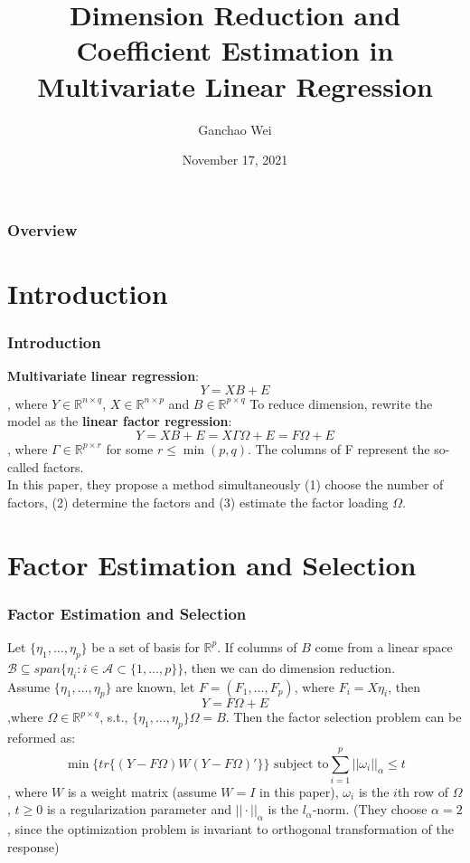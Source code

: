 \documentclass{beamer}
\title[multi-ridge]{Dimension Reduction and Coefficient Estimation in Multivariate Linear Regression}
\author{Ganchao Wei}
\date{November 17, 2021}
\begin{document}
	
	\begin{frame}
		\titlepage %
	\end{frame}
	
	\begin{frame}
		\frametitle{Overview} %
		\tableofcontents
	\end{frame}
	
	
	\section{Introduction}
	
	\begin{frame}
		\frametitle{Introduction}
		\textbf{Multivariate linear regression}: 
		$$Y=XB + E$$
		, where $Y\in\mathbb{R}^{n\times q}$, $X\in \mathbb{R}^{n\times p}$ and $B\in \mathbb{R}^{p\times q}$
		To reduce dimension, rewrite the model as the \textbf{linear factor regression}:
		$$Y=XB+E=X\Gamma\Omega + E = F\Omega + E$$
		, where $\Gamma\in\mathbb{R}^{p\times r}$ for some $r\leq \min(p,q)$. The columns of F represent the so-called factors.\\
		\vspace{\baselineskip}
		In this paper, they propose a method simultaneously (1) choose the number of factors, (2) determine the factors and (3) estimate the factor loading $\Omega$.
	\end{frame}
	
	\section{Factor Estimation and Selection}
	
	\begin{frame}
	\frametitle{Factor Estimation and Selection}
	Let $\{\eta_1,\ldots,\eta_p\}$ be a set of basis for $\mathbb{R}^p$. If columns of $B$ come from a linear space $\mathcal{B}\subseteq span\{\eta_i:i\in\mathcal{A}\subset\{1,\ldots,p\}\}$, then we can do dimension reduction.\\
	\vspace{\baselineskip}
	Assume $\{\eta_1,\ldots,\eta_p\}$ are known, let $F = (F_1,\ldots,F_p)$, where $F_i=X\eta_i$, then
	$$Y=F\Omega + E$$
	,where $\Omega\in\mathbb{R}^{p\times q}$, s.t., $\{\eta_1,\ldots,\eta_p\}\Omega = B$. Then the factor selection problem can be reformed as:
	$$\min\{tr\{(Y-F\Omega)W(Y-F\Omega)'\}\}\,\,\text{subject to} \sum_{i=1}^{p}||\omega_i||_{\alpha}\leq t$$
	, where $W$ is a weight matrix (assume $W=I$ in this paper), $\omega_i$ is the $i$th row of $\Omega$, $t\geq 0$ is a regularization parameter and $||\cdot||_{\alpha}$ is the $l_{\alpha}$-norm. (They choose $\alpha = 2$, since the optimization problem is invariant to orthogonal transformation of the response)
	\end{frame}	
	
\end{document}
